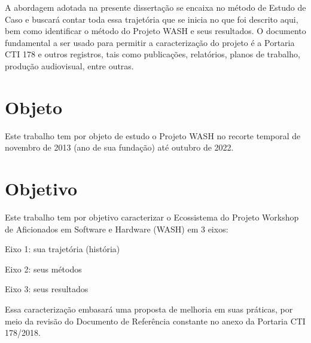 \documentclass[
12pt,		%
openright,	%
twoside,  %
a4paper,			%
chapter=TITLE,		%
english,			%
french,				%
spanish,			%
brazil				%
]{USPSC-classe/USPSC}
\begin{document}
A abordagem adotada na presente disserta\c{c}\~ao se encaixa no m\'etodo de \textquotedbl Estudo de Caso e buscar\'a contar toda essa trajet\'oria que se inicia no que foi descrito aqui, bem como identificar o m\'etodo do Projeto WASH e seus resultados. O documento fundamental a ser usado para permitir a caracteriza\c{c}\~ao do projeto \'e a Portaria CTI 178 e outros registros, tais como publica\c{c}\~oes, relat\'orios, planos de trabalho, produ\c{c}\~ao audiovisual, entre outras.














\section[Objeto]{Objeto}\label{Objeto}
Este trabalho tem por objeto de estudo o  Projeto WASH no recorte temporal de novembro de 2013 (ano de sua funda\c{c}\~ao) at\'e outubro de 2022.














\section[Objetivo]{Objetivo}\label{Objetivo}
Este trabalho tem por objetivo caracterizar o Ecossistema do Projeto Workshop de Aficionados em Software e Hardware (WASH) em 3 eixos:















\begin{alineas}
\item Eixo 1: sua trajet\'oria (hist\'oria)
\item Eixo 2: seus m\'etodos
\item Eixo 3: seus resultados
\end{alineas}

Essa caracteriza\c{c}\~ao embasar\'a uma proposta de melhoria em suas pr\'aticas, por meio da revis\~ao do Documento de Refer\^encia constante no anexo da Portaria CTI 178/2018.
\end{document}
